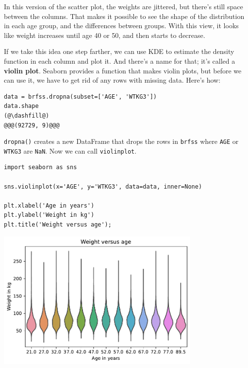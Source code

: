 In this version of the scatter plot, the weights are jittered, but
there's still space between the columns. That makes it possible to see
the shape of the distribution in each age group, and the differences
between groups. With this view, it looks like weight increases until age
40 or 50, and then starts to decrease.

If we take this idea one step farther, we can use KDE to estimate the
density function in each column and plot it. And there's a name for
that; it's called a \textbf{violin plot}. Seaborn provides a function
that makes violin plots, but before we can use it, we have to get rid of
any rows with missing data. Here's how:

\begin{lstlisting}[]
data = brfss.dropna(subset=['AGE', 'WTKG3'])
data.shape
(@\dashfill@)
@@@(92729, 9)@@@
\end{lstlisting}

\passthrough{\lstinline!dropna()!} creates a new DataFrame that drops
the rows in \passthrough{\lstinline!brfss!} where
\passthrough{\lstinline!AGE!} or \passthrough{\lstinline!WTKG3!} are
\passthrough{\lstinline!NaN!}. Now we can call
\passthrough{\lstinline!violinplot!}.

\begin{lstlisting}[]
import seaborn as sns

sns.violinplot(x='AGE', y='WTKG3', data=data, inner=None)

plt.xlabel('Age in years')
plt.ylabel('Weight in kg')
plt.title('Weight versus age');
\end{lstlisting}

\begin{center}
\includegraphics[width=4in]{chapters/09_relationships_files/09_relationships_42_0.pdf}
\end{center}

